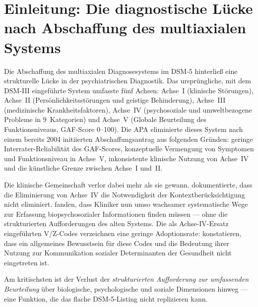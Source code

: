 \documentclass[11pt,a4paper]{article}
\begin{document}
\newpage


\section{Einleitung: Die diagnostische L\"ucke nach Abschaffung des multiaxialen Systems}
\label{sec:einleitung}

Die Abschaffung des multiaxialen Diagnosesystems im DSM-5 \citep{APA2013DSM5} hinterlie\ss{} eine strukturelle L\"ucke in der psychiatrischen Diagnostik. Das urspr\"ungliche, mit dem DSM-III \citep{APA1980DSM3} eingef\"uhrte System umfasste f\"unf Achsen: Achse~I (klinische St\"orungen), Achse~II (Pers\"onlichkeitsst\"orungen und geistige Behinderung), Achse~III (medizinische Krankheitsfaktoren), Achse~IV (psychosoziale und umweltbezogene Probleme in 9~Kategorien) und Achse~V (Globale Beurteilung des Funktionsniveaus, GAF-Score 0--100). Die APA eliminierte dieses System nach einem bereits 2004 initiierten Abschaffungsantrag aus folgenden Gr\"unden: geringe Interrater-Reliabilit\"at des GAF-Scores, konzeptuelle Vermengung von Symptomen und Funktionsniveau in Achse~V, inkonsistente klinische Nutzung von Achse~IV und die k\"unstliche Grenze zwischen Achse~I und~II.

Die klinische Gemeinschaft verlor dabei mehr als sie gewann. \citet{Probst2014Multiaxial} dokumentierte, dass die Eliminierung von Achse~IV \glqq die Notwendigkeit der Kontextber\"ucksichtigung nicht eliminiert\grqq{}. \citet{Kress2014Biopsychosocial} fanden, dass Kliniker nun \glqq umso wachsamer systematische Wege zur Erfassung biopsychosozialer Informationen\grqq{} finden m\"ussen --- ohne die strukturierten Aufforderungen des alten Systems. Die als Achse-IV-Ersatz eingef\"uhrten V/Z-Codes verzeichnen eine geringe Adoptionsrate: \citet{ErlichFirst2025SocialDeterminants} konstatieren, dass \glqq ein allgemeines Bewusstsein f\"ur diese Codes und die Bedeutung ihrer Nutzung zur Kommunikation sozialer Determinanten der Gesundheit nicht eingetreten ist\grqq{}.

Am kritischsten ist der Verlust der \textit{strukturierten Aufforderung zur umfassenden Beurteilung} \"uber biologische, psychologische und soziale Dimensionen hinweg --- eine Funktion, die das flache DSM-5-Listing nicht replizieren kann.
\end{document}
